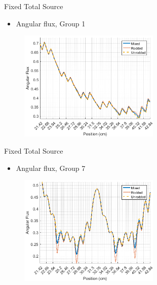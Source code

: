 
\begin{frame}[t]{Fixed Total Source}

\begin{itemize}
    \item Angular flux, Group 1
\end{itemize}
\begin{figure}[H]
    \centering
    \includegraphics[width=0.6\textwidth]{../figs/1dmoc-50mix-fixedscat-angflux1.png}
\end{figure}

\end{frame}


\begin{frame}[t]{Fixed Total Source}

\begin{itemize}
    \item Angular flux, Group 7
\end{itemize}
\begin{figure}[H]
  \centering
  \includegraphics[width=0.6\textwidth]{../figs/1dmoc-50mix-fixedscat-angflux7.png}
\end{figure}

\end{frame}

